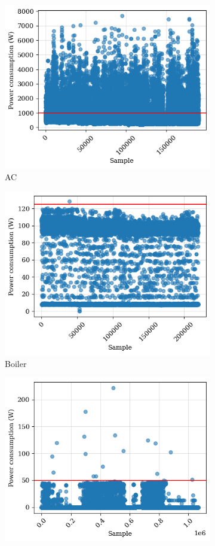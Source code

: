 \begin{figure}
    \begin{subfigure}{.5\textwidth}
      \centering
      \includegraphics[width=.9\linewidth]{images/raw_consumptions/ac.png}
      \caption{AC}
      \label{fig:ac}
    \end{subfigure}%
    \begin{subfigure}{.5\textwidth}
      \centering
      \includegraphics[width=.9\linewidth]{images/raw_consumptions/boiler.png}
      \caption{Boiler}
      \label{fig:boiler}
    \end{subfigure}
    \begin{subfigure}{\textwidth}
      \centering
      \includegraphics[width=.42\linewidth]{images/raw_consumptions/lamp.png}

\end{subfigure}
\end{figure}
